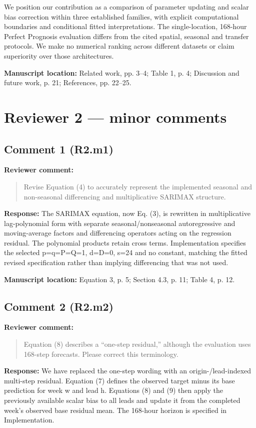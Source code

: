 \documentclass[11pt,a4paper]{article}
\begin{document}
We position our contribution as a comparison of parameter updating and scalar bias correction within three established families, with explicit computational boundaries and conditional fitted interpretations. The single-location, 168-hour Perfect Prognosis evaluation differs from the cited spatial, seasonal and transfer protocols. We make no numerical ranking across different datasets or claim superiority over those architectures.

\textbf{Manuscript location:} Related work, pp. 3--4; Table 1, p. 4; Discussion and future work, p. 21; References, pp. 22--25.
\clearpage
\section*{Reviewer 2 --- minor comments}
\begin{samepage}
\subsection*{Comment 1 (R2.m1)}
\textbf{Reviewer comment:}
\begin{quote}\small Revise Equation (4) to accurately represent the implemented seasonal and non-seasonal differencing and multiplicative SARIMAX structure.\end{quote}
\end{samepage}
\textbf{Response:}
The SARIMAX equation, now Eq. (3), is rewritten in multiplicative lag-polynomial form with separate seasonal/nonseasonal autoregressive and moving-average factors and differencing operators acting on the regression residual. The polynomial products retain cross terms. Implementation specifies the selected p=q=P=Q=1, d=D=0, s=24 and no constant, matching the fitted revised specification rather than implying differencing that was not used.

\textbf{Manuscript location:} Equation 3, p. 5; Section 4.3, p. 11; Table 4, p. 12.
\begin{samepage}
\subsection*{Comment 2 (R2.m2)}
\textbf{Reviewer comment:}
\begin{quote}\small Equation (8) describes a ``one-step residual,'' although the evaluation uses 168-step forecasts. Please correct this terminology.\end{quote}
\end{samepage}
\textbf{Response:}
We have replaced the one-step wording with an origin-/lead-indexed multi-step residual. Equation (7) defines the observed target minus its base prediction for week w and lead h. Equations (8) and (9) then apply the previously available scalar bias to all leads and update it from the completed week's observed base residual mean. The 168-hour horizon is specified in Implementation.
\end{document}

